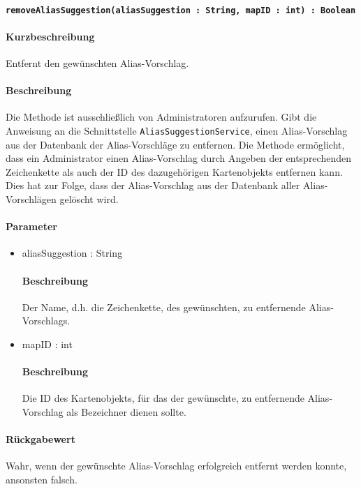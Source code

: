 \paragraph*{\texttt{removeAliasSuggestion(aliasSuggestion : String, mapID : int) : Boolean}}%
\paragraph*{Kurzbeschreibung}
Entfernt den gewünschten Alias-Vorschlag.
\paragraph*{Beschreibung}
Die Methode ist ausschließlich von Administratoren aufzurufen.
Gibt die Anweisung an die Schnittstelle \texttt{AliasSuggestionService}, einen Alias-Vorschlag aus der Datenbank der Alias-Vorschläge zu entfernen.
Die Methode ermöglicht, dass ein Administrator einen Alias-Vorschlag durch Angeben der entsprechenden Zeichenkette als auch der ID des dazugehörigen Kartenobjekts entfernen kann.
Dies hat zur Folge, dass der Alias-Vorschlag aus der Datenbank aller Alias-Vorschlägen gelöscht wird.
\paragraph*{Parameter}
\begin{itemize}
	\item aliasSuggestion : String
		\paragraph*{Beschreibung}
		Der Name, d.h. die Zeichenkette, des gewünschten, zu entfernende Alias-Vorschlags.
	\item mapID : int
		\paragraph*{Beschreibung}
		Die ID des Kartenobjekts, für das der gewünschte, zu entfernende Alias-Vorschlag als Bezeichner dienen sollte.
\end{itemize}
\paragraph*{Rückgabewert}
Wahr, wenn der gewünschte Alias-Vorschlag erfolgreich entfernt werden konnte, ansonsten falsch.
